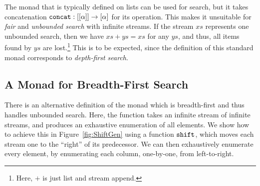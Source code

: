 The monad that is typically defined on lists can be used for search, but it takes concatenation $\texttt{concat} : [[\alpha]] \rightarrow [\alpha]$ for its  operation. This makes it unsuitable for \emph{fair} and \emph{unbounded search} with infinite streams. If the stream $xs$ represents one unbounded search, then we have $xs + ys = xs$ for any $ys$, and thus, all items found by $ys$ are lost.\footnote{Here, $+$ is just list and stream append.} This is to be expected, since the definition of this standard monad corresponds to \emph{depth-first search}. 

\subsection{A Monad for Breadth-First Search}\label{sec:StreamMonad}
There is an alternative definition of the monad which is breadth-first and thus handles unbounded search. Here, the  function takes an infinite stream of infinite streams, and produces an exhaustive enumeration of all elements. We show how to achieve this in Figure~\ref{fig:ShiftGen} using a function $\texttt{shift}$, which moves each stream one to the ``right'' of its predecessor. We can then exhaustively enumerate every element, by enumerating each column, one-by-one, from left-to-right. 

